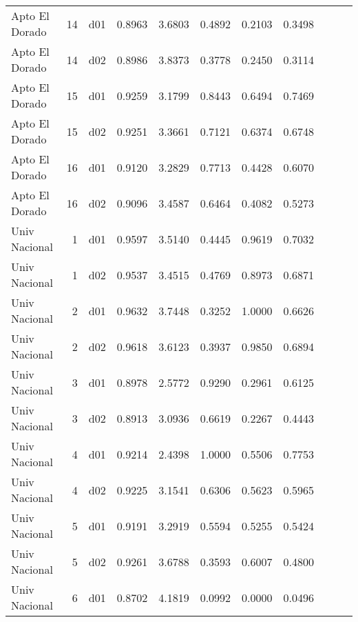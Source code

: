 \begin{landscape}
\begin{longtable}{p{2cm}rrrrrrrrrr}
          Apto El Dorado  &         14 &     d01 &   0.8963 &  3.6803 &        0.4892 &           0.2103 &  0.3498 \\
          Apto El Dorado  &         14 &     d02 &   0.8986 &  3.8373 &        0.3778 &           0.2450 &  0.3114 \\
          Apto El Dorado  &         15 &     d01 &   0.9259 &  3.1799 &        0.8443 &           0.6494 &  0.7469 \\
          Apto El Dorado  &         15 &     d02 &   0.9251 &  3.3661 &        0.7121 &           0.6374 &  0.6748 \\
          Apto El Dorado  &         16 &     d01 &   0.9120 &  3.2829 &        0.7713 &           0.4428 &  0.6070 \\
          Apto El Dorado  &         16 &     d02 &   0.9096 &  3.4587 &        0.6464 &           0.4082 &  0.5273 \\
           Univ Nacional  &          1 &     d01 &   0.9597 &  3.5140 &        0.4445 &           0.9619 &  0.7032 \\
           Univ Nacional  &          1 &     d02 &   0.9537 &  3.4515 &        0.4769 &           0.8973 &  0.6871 \\
           Univ Nacional  &          2 &     d01 &   0.9632 &  3.7448 &        0.3252 &           1.0000 &  0.6626 \\
           Univ Nacional  &          2 &     d02 &   0.9618 &  3.6123 &        0.3937 &           0.9850 &  0.6894 \\
           Univ Nacional  &          3 &     d01 &   0.8978 &  2.5772 &        0.9290 &           0.2961 &  0.6125 \\
           Univ Nacional  &          3 &     d02 &   0.8913 &  3.0936 &        0.6619 &           0.2267 &  0.4443 \\
           Univ Nacional  &          4 &     d01 &   0.9214 &  2.4398 &        1.0000 &           0.5506 &  0.7753 \\
           Univ Nacional  &          4 &     d02 &   0.9225 &  3.1541 &        0.6306 &           0.5623 &  0.5965 \\
           Univ Nacional  &          5 &     d01 &   0.9191 &  3.2919 &        0.5594 &           0.5255 &  0.5424 \\
           Univ Nacional  &          5 &     d02 &   0.9261 &  3.6788 &        0.3593 &           0.6007 &  0.4800 \\
           Univ Nacional  &          6 &     d01 &   0.8702 &  4.1819 &        0.0992 &           0.0000 &  0.0496 \\

\end{longtable}
\end{landscape}
